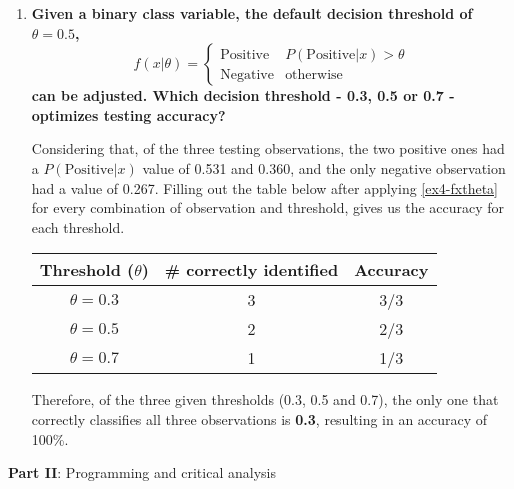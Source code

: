\documentclass[12pt]{article}
\begin{document}
\begin{enumerate}[leftmargin=\labelsep,resume]
    \item {\bfseries
          Given a binary class variable, the default decision threshold of $\theta = 0.5$,
          \begin{equation}\label{ex4-fxtheta}
              f(x|\theta) = \begin{cases}
                  \text{Positive} & P(\text{Positive}|x) > \theta \\
                  \text{Negative} & \text{otherwise}
              \end{cases}
          \end{equation}
          can be adjusted.
          Which decision threshold - 0.3, 0.5 or 0.7 - optimizes testing accuracy?
          }

          Considering that, of the three testing observations,
          the two positive ones had a $P(\text{Positive}|x)$ value
          of 0.531 and 0.360, and the only negative observation had a
          value of 0.267.
          Filling out the table below after applying \eqref{ex4-fxtheta} for
          every combination of observation and threshold, gives us the accuracy
          for each threshold.

          \begin{center}
              \captionsetup{type=table}
              \begin{tabular}{c|c|c}
                  Threshold ($\theta$) & \# correctly identified & Accuracy \\
                  \hline
                  $\theta = 0.3$       & 3                       & 3/3      \\
                  $\theta = 0.5$       & 2                       & 2/3      \\
                  $\theta = 0.7$       & 1                       & 1/3
              \end{tabular}
          \end{center}

          Therefore, of the three given thresholds (0.3, 0.5 and 0.7),
          the only one that correctly classifies all three observations
          is \textbf{0.3}, resulting in an accuracy of 100\%.


\end{enumerate}

\pagebreak

\begin{center}
    \large{\textbf{Part II}: Programming and critical analysis}
\end{center}
\end{document}
